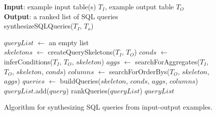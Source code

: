 \begin{figure}[t]

\textbf{Input}: example input table(s) $T_I$, example output table $T_O$\\

\vspace{-4mm}
\textbf{Output}: a ranked list of SQL queries\\
\vspace{1mm}
synthesizeSQLQueries({$T_{I}$, $T_{o}$})\\
\vspace{-5mm}
\begin{algorithmic}[1]
\STATE $\mathit{queryList}$ $\leftarrow$ an empty list\\
\STATE $\mathit{skeletons}$ $\leftarrow$ createQuerySkeletons($\mathit{T_I}$, $\mathit{T_O}$)
\STATE $\mathit{conds}$ $\leftarrow$ inferConditions($\mathit{T_I}$, $\mathit{T_O}$, $\mathit{skeleton}$)
\STATE $\mathit{aggs}$ $\leftarrow$ searchForAggregates($\mathit{T_I}$, $\mathit{T_O}$, $\mathit{skeleton}$, $conds$)
\STATE $\mathit{columns}$ $\leftarrow$ searchForOrderBys($\mathit{T_O}$, $\mathit{skeleton}$, $\mathit{aggs}$)
\STATE $\mathit{queries}$ $\leftarrow$ buildQueries($\mathit{skeleton}$, $\mathit{conds}$, $\mathit{aggs}$, $\mathit{columns}$)
\STATE $\mathit{queryList}$.add($\mathit{query}$)
\ENDIF
\ENDFOR
\ENDFOR
\STATE rankQueries($\mathit{queryList}$)
\RETURN $\mathit{queryList}$
\end{algorithmic}
\vspace{-3mm}
\caption{Algorithm for synthesizing SQL queries from input-output examples.}
 \label{fig:algorithm}
\end{figure}
